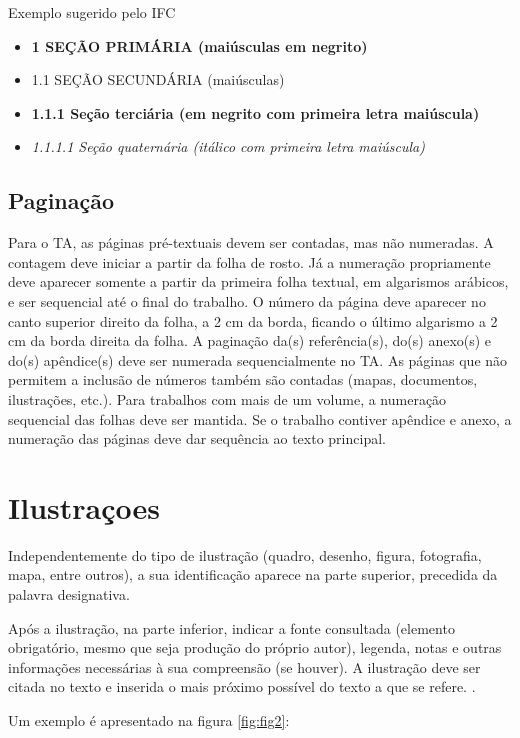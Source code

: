 Exemplo sugerido pelo IFC
\begin{itemize}
\item[] \textbf{1  SEÇÃO PRIMÁRIA (maiúsculas em negrito)}
\item[] 1.1  SEÇÃO SECUNDÁRIA (maiúsculas)
\item[] \textbf{1.1.1   Seção terciária (em negrito com primeira letra maiúscula)}
\item[] \textit{1.1.1.1 Seção quaternária (itálico com primeira letra maiúscula)}
\end{itemize}


\subsection{Paginação}
Para o TA, as páginas pré-textuais devem ser contadas, mas não numeradas. A contagem deve iniciar a partir da folha de rosto. Já a numeração propriamente deve aparecer somente a partir da primeira folha textual, em algarismos arábicos, e ser sequencial até o final do trabalho. 
O número da página deve aparecer no canto superior direito da folha, a 2 cm da borda, ficando o último algarismo a 2 cm da borda direita da folha.
A paginação da(s) referência(s), do(s) anexo(s) e do(s) apêndice(s) deve ser numerada sequencialmente no TA. As páginas que não permitem a inclusão de números também são contadas (mapas, documentos, ilustrações, etc.).
Para trabalhos com mais de um volume, a numeração sequencial das folhas deve ser mantida. Se o trabalho contiver apêndice e anexo, a numeração das páginas deve dar sequência ao texto principal.

\section{Ilustraçoes}
Independentemente do tipo de ilustração (quadro, desenho, figura, fotografia, mapa, entre outros), a sua identificação aparece na parte superior, precedida da palavra designativa. 
\begin{citacao}
Após a ilustração, na parte inferior, indicar a fonte consultada (elemento obrigatório, mesmo que seja produção do próprio autor), legenda, notas e outras informações necessárias à sua compreensão (se houver). A ilustração deve ser citada no texto e inserida o mais próximo possível do texto a que se refere. \cite[p. 11]{abnt14724}.
\end{citacao}

Um exemplo é apresentado na figura \ref{fig:fig2}:


